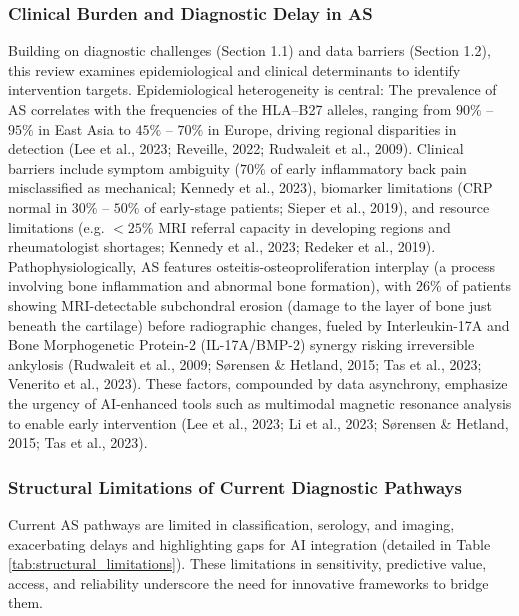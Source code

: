 \documentclass[12pt, a4paper]{article}
\begin{document}
\subsubsection{Clinical Burden and Diagnostic Delay in AS}
Building on diagnostic challenges (Section 1.1) and data barriers (Section 1.2), this review examines epidemiological and clinical determinants to identify intervention targets. Epidemiological heterogeneity is central: The prevalence of AS correlates with the frequencies of the HLA--B27 alleles, ranging from $90\%$ -- $95\%$ in East Asia to $45\%$ -- $70\%$ in Europe, driving regional disparities in detection (Lee et al., 2023; Reveille, 2022; Rudwaleit et al., 2009). Clinical barriers include symptom ambiguity ($70\%$ of early inflammatory back pain misclassified as mechanical; Kennedy et al., 2023), biomarker limitations (CRP normal in $30\%$ -- $50\%$ of early-stage patients; Sieper et al., 2019), and resource limitations (e.g. $<25\%$ MRI referral capacity in developing regions and rheumatologist shortages; Kennedy et al., 2023; Redeker et al., 2019). Pathophysiologically, AS features osteitis-osteoproliferation interplay (a process involving bone inflammation and abnormal bone formation), with $26\%$ of patients showing MRI-detectable subchondral erosion (damage to the layer of bone just beneath the cartilage) before radiographic changes, fueled by Interleukin-17A and Bone Morphogenetic Protein-2 (IL-17A/BMP-2) synergy risking irreversible ankylosis (Rudwaleit et al., 2009; Sørensen \& Hetland, 2015; Tas et al., 2023; Venerito et al., 2023). These factors, compounded by data asynchrony, emphasize the urgency of AI-enhanced tools such as multimodal magnetic resonance analysis to enable early intervention (Lee et al., 2023; Li et al., 2023; Sørensen \& Hetland, 2015; Tas et al., 2023).

\subsubsection{Structural Limitations of Current Diagnostic Pathways}
Current AS pathways are limited in classification, serology, and imaging, exacerbating delays and highlighting gaps for AI integration (detailed in Table \ref{tab:structural_limitations}). These limitations in sensitivity, predictive value, access, and reliability underscore the need for innovative frameworks to bridge them.
\end{document}
